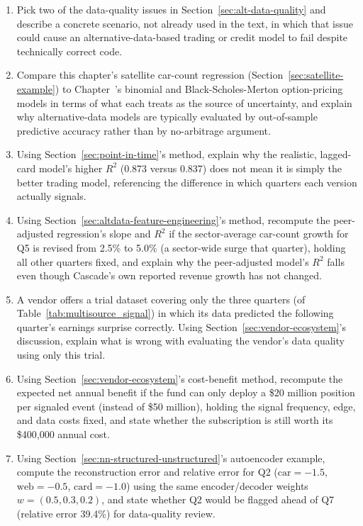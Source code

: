 \documentclass[../ai_in_finance]{subfiles}
\begin{document}
\begin{enumerate}[exercises]
    \item Pick two of the data-quality issues in Section~\ref{sec:alt-data-quality} and describe a concrete scenario, not already used in the text, in which that issue could cause an alternative-data-based trading or credit model to fail despite technically correct code.
    \item Compare this chapter's satellite car-count regression (Section~\ref{sec:satellite-example}) to Chapter~'s binomial and Black-Scholes-Merton option-pricing models in terms of what each treats as the source of uncertainty, and explain why alternative-data models are typically evaluated by out-of-sample predictive accuracy rather than by no-arbitrage argument.
    \item Using Section~\ref{sec:point-in-time}'s method, explain why the realistic, lagged-card model's higher $R^2$ (0.873 versus 0.837) does not mean it is simply the better trading model, referencing the difference in which quarters each version actually signals.
    \item Using Section~\ref{sec:altdata-feature-engineering}'s method, recompute the peer-adjusted regression's slope and $R^2$ if the sector-average car-count growth for Q5 is revised from 2.5\% to 5.0\% (a sector-wide surge that quarter), holding all other quarters fixed, and explain why the peer-adjusted model's $R^2$ falls even though Cascade's own reported revenue growth has not changed.
    \item A vendor offers a trial dataset covering only the three quarters (of Table~\ref{tab:multisource_signal}) in which its data predicted the following quarter's earnings surprise correctly. Using Section~\ref{sec:vendor-ecosystem}'s discussion, explain what is wrong with evaluating the vendor's data quality using only this trial.
    \item Using Section~\ref{sec:vendor-ecosystem}'s cost-benefit method, recompute the expected net annual benefit if the fund can only deploy a \$20 million position per signaled event (instead of \$50 million), holding the signal frequency, edge, and data costs fixed, and state whether the subscription is still worth its \$400,000 annual cost.
    \item Using Section~\ref{sec:nn-structured-unstructured}'s autoencoder example, compute the reconstruction error and relative error for Q2 ($\text{car}=-1.5$, $\text{web}=-0.5$, $\text{card}=-1.0$) using the same encoder/decoder weights $w=(0.5,0.3,0.2)$, and state whether Q2 would be flagged ahead of Q7 (relative error 39.4\%) for data-quality review.

\end{enumerate}
\end{document}
